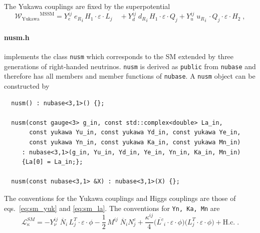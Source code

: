 \documentclass[11pt,a4paper]{article}
\begin{document}
The Yukawa couplings are fixed by the superpotential
\begin{equation} \label{eq:mssm_yuk}
  \mathcal{W_\mathrm{Yukawa}}^{\mathrm{MSSM}} = Y_e^{ij} \; {e_R}_i\, H_1\cdot \varepsilon \cdot L_j \quad + Y_d^{ij} \; {d_R}_i \, H_1\cdot \varepsilon \cdot Q_j + Y_u^{ij} \; {u_R}_i \, \cdot Q_j\cdot \varepsilon \cdot H_2 \;,
\end{equation} 

\paragraph{nusm.h}
implements the class \texttt{nusm} which corresponds to the SM extended by three generations of right-handed neutrinos.
\texttt{nusm} is derived as \texttt{public} from \texttt{nubase} and therefore has all members and member functions of \texttt{nubase}. A \texttt{nusm} object can be constructed by
\begin{lstlisting}
  nusm() : nubase<3,1>() {};
 
  nusm(const gauge<3> g_in, const std::complex<double> La_in,
       const yukawa Yu_in, const yukawa Yd_in, const yukawa Ye_in,
       const yukawa Yn_in, const yukawa Ka_in, const yukawa Mn_in)
     : nubase<3,1>(g_in, Yu_in, Yd_in, Ye_in, Yn_in, Ka_in, Mn_in)
     {La[0] = La_in;};
  
  nusm(const nubase<3,1> &X) : nubase<3,1>(X) {};
\end{lstlisting}
The conventions for the Yukawa couplings and Higgs couplings are those of eqs.~\eqref{eq:sm_yuk} and \eqref{eq:sm_la}. The conventions for \texttt{Yn, Ka, Mn} are
\begin{equation}\label{eq:sm_nu}
  \mathcal{L}_{\kappa}^{SM} = - Y_\nu^{ij}\; \overline{N}_i\, L_j^T \cdot \varepsilon \cdot \phi -\frac{1}{2}\, M^{ij}\; \overline{N}_i N^c_j  + \frac{\kappa^{ij}}{4} \bigl(\overline{L^c}_i\cdot \varepsilon \cdot \phi \bigr) \bigl(L_j^T\cdot \varepsilon \cdot \phi \bigr) + \mathrm{H.c.} \;.
\end{equation}
\end{document}
